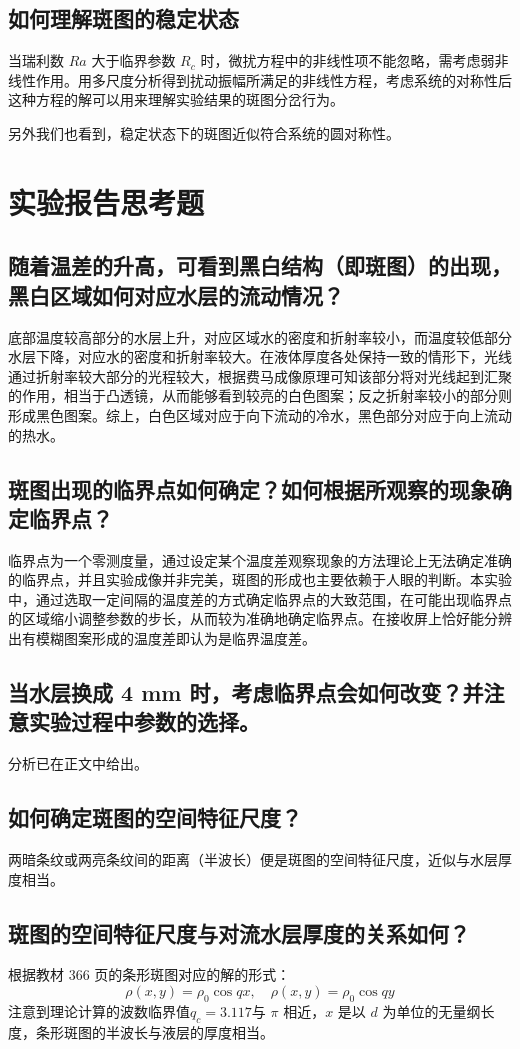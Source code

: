 \documentclass[aps,pre,12pt,preprint,onecolumn,showpacs,showkeys]{revtex4-1}
\begin{document}
	\subsection{如何理解斑图的稳定状态}
		当瑞利数 $Ra$ 大于临界参数 $R_c$ 时，微扰方程中的非线性项不能忽略，需考虑弱非线性作用。用多尺度分析得到扰动振幅所满足的非线性方程，考虑系统的对称性后这种方程的解可以用来理解实验结果的斑图分岔行为。
	
		另外我们也看到，稳定状态下的斑图近似符合系统的圆对称性。
	
\section{实验报告思考题}
	\subsection{随着温差的升高，可看到黑白结构（即斑图）的出现，黑白区域如何对应水层的流动情况？}
		底部温度较高部分的水层上升，对应区域水的密度和折射率较小，而温度较低部分水层下降，对应水的密度和折射率较大。在液体厚度各处保持一致的情形下，光线通过折射率较大部分的光程较大，根据费马成像原理可知该部分将对光线起到汇聚的作用，相当于凸透镜，从而能够看到较亮的白色图案；反之折射率较小的部分则形成黑色图案。综上，白色区域对应于向下流动的冷水，黑色部分对应于向上流动的热水。
	\subsection{斑图出现的临界点如何确定？如何根据所观察的现象确定临界点？}
		临界点为一个零测度量，通过设定某个温度差观察现象的方法理论上无法确定准确的临界点，并且实验成像并非完美，斑图的形成也主要依赖于人眼的判断。本实验中，通过选取一定间隔的温度差的方式确定临界点的大致范围，在可能出现临界点的区域缩小调整参数的步长，从而较为准确地确定临界点。在接收屏上恰好能分辨出有模糊图案形成的温度差即认为是临界温度差。
	\subsection{当水层换成 4 mm 时，考虑临界点会如何改变？并注意实验过程中参数的选择。}
		分析已在正文中给出。
	\subsection{如何确定斑图的空间特征尺度？}
		两暗条纹或两亮条纹间的距离（半波长）便是斑图的空间特征尺度，近似与水层厚度相当。
	\subsection{斑图的空间特征尺度与对流水层厚度的关系如何？}
		根据教材 366 页的条形斑图对应的解的形式：
		\begin{equation}
			\rho(x,y)=\rho_0 \cos qx,\quad \rho(x,y)=\rho_0 \cos qy
		\end{equation}
		注意到理论计算的波数临界值$q_c=3.117$与 $\pi$ 相近，$x$ 是以 $d$ 为单位的无量纲长度，条形斑图的半波长与液层的厚度相当。
\end{document}
